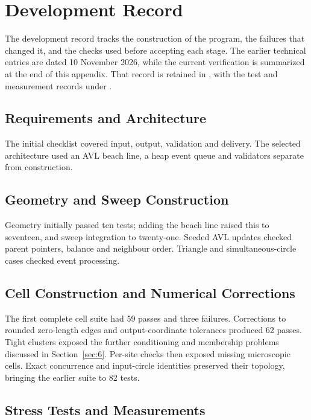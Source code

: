 \section{Development Record}
\label{sec:b}

The development record tracks the construction of the program, the failures that changed it, and the checks used before accepting each stage. The earlier technical entries are dated 10 November 2026, while the current verification is summarized at the end of this appendix. That record is retained in , with the test and measurement records under .




\subsection{Requirements and Architecture}

The initial checklist covered input, output, validation and delivery. The selected architecture used an AVL beach line, a heap event queue and validators separate from construction.

\subsection{Geometry and Sweep Construction}

Geometry initially passed ten tests; adding the beach line raised this to seventeen, and sweep integration to twenty-one. Seeded AVL updates checked parent pointers, balance and neighbour order. Triangle and simultaneous-circle cases checked event processing.

\subsection{Cell Construction and Numerical Corrections}

The first complete cell suite had 59 passes and three failures. Corrections to rounded zero-length edges and output-coordinate tolerances produced 62 passes. Tight clusters exposed the further conditioning and membership problems discussed in Section~\ref{sec:6}. Per-site checks then exposed missing microscopic cells. Exact concurrence and input-circle identities preserved their topology, bringing the earlier suite to 82 tests.

\subsection{Stress Tests and Measurements}

